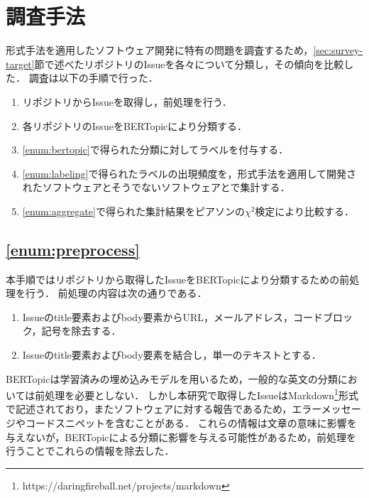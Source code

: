 \documentclass[main]{subfiles}
\begin{document}
\chapter{調査手法}

形式手法を適用したソフトウェア開発に特有の問題を調査するため，\ref{sec:survey-target}節で述べたリポジトリのIssueを各々について分類し，その傾向を比較した．
調査は以下の手順で行った．

\begin{enumerate}[label=手順\arabic*.]
	\item \label{enum:preprocess}
	      リポジトリからIssueを取得し，前処理を行う．
	\item \label{enum:bertopic}
	      各リポジトリのIssueをBERTopicにより分類する．
	\item \label{enum:labeling}
	      \ref{enum:bertopic}で得られた分類に対してラベルを付与する．
	\item \label{enum:aggregate}
	      \ref{enum:labeling}で得られたラベルの出現頻度を，形式手法を適用して開発されたソフトウェアとそうでないソフトウェアとで集計する．
	\item \label{enum:statistical}
	      \ref{enum:aggregate}で得られた集計結果をピアソンの\(\chi^2\)検定により比較する．
\end{enumerate}

\section{\ref{enum:preprocess}}
\label{sec:preprocess}

本手順ではリポジトリから取得したIssueをBERTopicにより分類するための前処理を行う．
前処理の内容は次の通りである．

\begin{enumerate}
	\item \label{enum:filter}
	      Issueのtitle要素およびbody要素からURL，メールアドレス，コードブロック，記号を除去する．
	\item \label{enum:lowercase}
	      Issueのtitle要素およびbody要素を結合し，単一のテキストとする．
\end{enumerate}

BERTopicは学習済みの埋め込みモデルを用いるため，一般的な英文の分類においては前処理を必要としない．
しかし本研究で取得したIssueはMarkdown\footnote{https://daringfireball.net/projects/markdown}形式で記述されており，またソフトウェアに対する報告であるため，エラーメッセージやコードスニペットを含むことがある．
これらの情報は文章の意味に影響を与えないが，BERTopicによる分類に影響を与える可能性があるため，前処理を行うことでこれらの情報を除去した．
\end{document}
